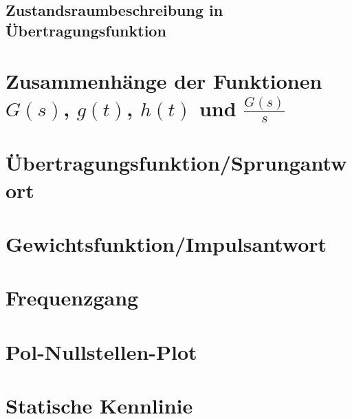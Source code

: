 \documentclass[
  ngerman
  ,12pt
  ,pdftex
]{article}
\begin{document}
\subsection*{Zustandsraumbeschreibung in Übertragungsfunktion} %


\section{Zusammenhänge der Funktionen $G(s)$, $g(t)$, $h(t)$ und $\frac{G(s)}{s}$}   %


\section{Übertragungsfunktion/Sprungantwort}


\section{Gewichtsfunktion/Impulsantwort} %


\section{Frequenzgang}


\section{Pol-Nullstellen-Plot}


\section{Statische Kennlinie}%

\end{document}
